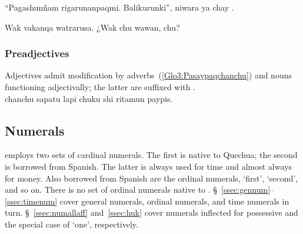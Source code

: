 {%
%
{“Pagashunñam rigarunanpaqmi. Balikurunki”, niwara ya chay  .}%
{}%
{}{}%

%
{Wak vakanqa watrarusa. ¿Wak chu wawan, chu?}%
{}%
{}{}%

\subsubsection{Preadjectives}\label{ssec:preadj}
Adjectives admit modification by adverbs~(\ref{Glo3:Pasaypaqchanchu}) and nouns functioning adjectivally; the latter are suffixed with .\\

%
{ chanchu sapatu  lapi chuku shi ritamun paypis.}%
{}%
{}{}%

\subsection{Numerals}\label{sec:numerals}
\SYQ{} employs two sets of cardinal numerals. The first is native to Quechua; the second is borrowed from Spanish. The latter is always used for time and almost always for money. Also borrowed from Spanish are the ordinal numerals,  ‘first’,  ‘second’, and so on. There is no set of ordinal numerals native to \SYQ. §~\ref{ssec:gennum}--\ref{ssec:timenum} cover general numerals, ordinal numerals, and time numerals in turn. §~\ref{ssec:numallaff} and~\ref{ssec:huk} cover numerals inflected for possessive and the special case of  ‘one’, respectively.

}
